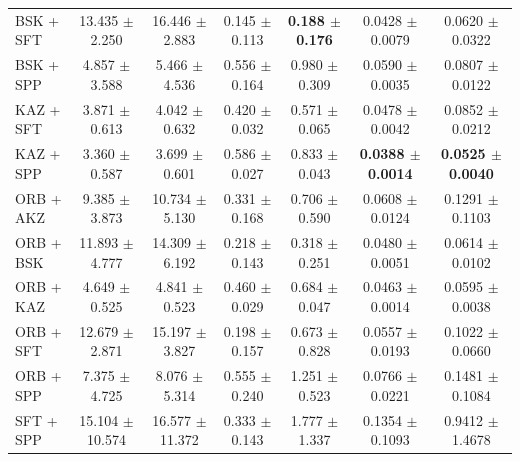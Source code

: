 \begin{table}[hbp]
\begin{tabular}{lcccccc}
BSK + SFT & 13.435 $\pm$ 2.250 & 16.446 $\pm$ 2.883 & 0.145 $\pm$ 0.113 & \textbf{0.188 $\pm$ 0.176} & 0.0428 $\pm$ 0.0079 & 0.0620 $\pm$ 0.0322 \\
BSK + SPP & 4.857 $\pm$ 3.588 & 5.466 $\pm$ 4.536 & 0.556 $\pm$ 0.164 & 0.980 $\pm$ 0.309 & 0.0590 $\pm$ 0.0035 & 0.0807 $\pm$ 0.0122 \\
KAZ + SFT & 3.871 $\pm$ 0.613 & 4.042 $\pm$ 0.632 & 0.420 $\pm$ 0.032 & 0.571 $\pm$ 0.065 & 0.0478 $\pm$ 0.0042 & 0.0852 $\pm$ 0.0212 \\
KAZ + SPP & 3.360 $\pm$ 0.587 & 3.699 $\pm$ 0.601 & 0.586 $\pm$ 0.027 & 0.833 $\pm$ 0.043 & \textbf{0.0388 $\pm$ 0.0014} & \textbf{0.0525 $\pm$ 0.0040} \\
ORB + AKZ & 9.385 $\pm$ 3.873 & 10.734 $\pm$ 5.130 & 0.331 $\pm$ 0.168 & 0.706 $\pm$ 0.590 & 0.0608 $\pm$ 0.0124 & 0.1291 $\pm$ 0.1103 \\
ORB + BSK & 11.893 $\pm$ 4.777 & 14.309 $\pm$ 6.192 & 0.218 $\pm$ 0.143 & 0.318 $\pm$ 0.251 & 0.0480 $\pm$ 0.0051 & 0.0614 $\pm$ 0.0102 \\
ORB + KAZ & 4.649 $\pm$ 0.525 & 4.841 $\pm$ 0.523 & 0.460 $\pm$ 0.029 & 0.684 $\pm$ 0.047 & 0.0463 $\pm$ 0.0014 & 0.0595 $\pm$ 0.0038 \\
ORB + SFT & 12.679 $\pm$ 2.871 & 15.197 $\pm$ 3.827 & 0.198 $\pm$ 0.157 & 0.673 $\pm$ 0.828 & 0.0557 $\pm$ 0.0193 & 0.1022 $\pm$ 0.0660 \\
ORB + SPP & 7.375 $\pm$ 4.725 & 8.076 $\pm$ 5.314 & 0.555 $\pm$ 0.240 & 1.251 $\pm$ 0.523 & 0.0766 $\pm$ 0.0221 & 0.1481 $\pm$ 0.1084 \\
SFT + SPP & 15.104 $\pm$ 10.574 & 16.577 $\pm$ 11.372 & 0.333 $\pm$ 0.143 & 1.777 $\pm$ 1.337 & 0.1354 $\pm$ 0.1093 & 0.9412 $\pm$ 1.4678 \\
\bottomrule
\end{tabular}
\end{table}